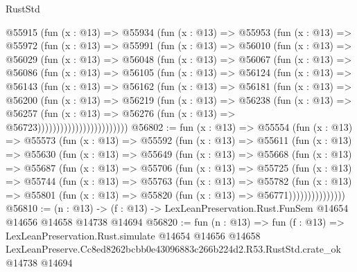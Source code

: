 \begin{lexlean}{RustStd}
\begin{coremodule}
          @55915
            (fun (x : @13) =>
            @55934
              (fun (x : @13) =>
              @55953
                (fun (x : @13) =>
                @55972
                  (fun (x : @13) =>
                  @55991
                    (fun (x : @13) =>
                    @56010
                      (fun (x : @13) =>
                      @56029
                        (fun (x : @13) =>
                        @56048
                          (fun (x : @13) =>
                          @56067
                            (fun (x : @13) =>
                            @56086
                              (fun (x : @13) =>
                              @56105
                                (fun (x : @13) =>
                                @56124
                                  (fun (x : @13) =>
                                  @56143
                                    (fun (x : @13) =>
                                    @56162
                                      (fun (x : @13) =>
                                      @56181
                                        (fun (x : @13) =>
                                        @56200
                                          (fun (x : @13) =>
                                          @56219
                                            (fun (x : @13) =>
                                            @56238
                                              (fun (x : @13) =>
                                              @56257
                                                (fun (x : @13) =>
                                                @56276
                                                  (fun (x : @13) => @56723))))))))))))))))))))))))
@56802 := fun (x : @13) =>
  @55554
    (fun (x : @13) =>
    @55573
      (fun (x : @13) =>
      @55592
        (fun (x : @13) =>
        @55611
          (fun (x : @13) =>
          @55630
            (fun (x : @13) =>
            @55649
              (fun (x : @13) =>
              @55668
                (fun (x : @13) =>
                @55687
                  (fun (x : @13) =>
                  @55706
                    (fun (x : @13) =>
                    @55725
                      (fun (x : @13) =>
                      @55744
                        (fun (x : @13) =>
                        @55763
                          (fun (x : @13) =>
                          @55782
                            (fun (x : @13) =>
                            @55801 (fun (x : @13) => @55820 (fun (x : @13) => @56771)))))))))))))))
@56810 := (n : @13) ->
  (f : @13) -> LexLeanPreservation.Rust.FunSem @14654 @14656 @14658 @14738 @14694
@56820 := fun (n : @13) =>
  fun (f : @13) =>
  LexLeanPreservation.Rust.simulate
    @14654
    @14656
    @14658
    LexLeanPreserve.Cc8ed8262bcbb0e43096883c266b224d2.R53.RustStd.crate_ok
    @14738
    @14694
\end{coremodule}
\end{lexlean}
